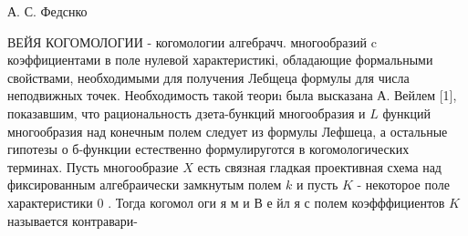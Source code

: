 \documentclass[10pt]{article}
\begin{document}
А. С. Федснко



ВЕЙЯ КОГОМОЛОГИИ - когомологии алгебрачч. многообразий $\mathrm{c}$ коэффициентами в поле нулевой характеристикі, обладающие формальными свойствами, необходимыми для получения Лебщеца формулы для числа неподвижных точек. Необходимость такой теориı была высказана А. Вейлем [1], показавшим, что рациональность дзета-бункций многообразия и $L$ функций многообразия над конечным полем следует из формулы Лефшеца, а остальные гипотезы о б-функции естественно формулируготся в когомологических терминах. Пусть многообразие $X$ есть связная гладкая проективная схема над фиксированным алгебраически замкнутым полем $k$ и пусть $K$ - некоторое поле характеристики 0 . Тогда когомол оги я м и В е йл я с полем коэфффициентов $K$ называется контравари-
\end{document}
